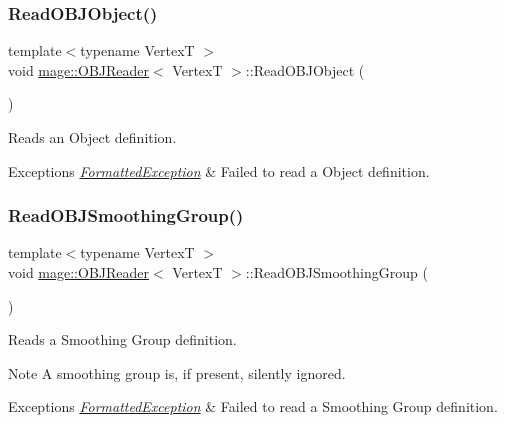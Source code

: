 \subsubsection{\texorpdfstring{Read\+O\+B\+J\+Object()}{ReadOBJObject()}}
{\footnotesize\ttfamily template$<$typename VertexT $>$ \\
void \hyperlink{classmage_1_1_o_b_j_reader}{mage\+::\+O\+B\+J\+Reader}$<$ VertexT $>$\+::Read\+O\+B\+J\+Object (\begin{DoxyParamCaption}{ }\end{DoxyParamCaption})\hspace{0.3cm}{\ttfamily [private]}}

Reads an Object definition.


\begin{DoxyExceptions}{Exceptions}
{\em \hyperlink{structmage_1_1_formatted_exception}{Formatted\+Exception}} & Failed to read a Object definition. \\
\hline
\end{DoxyExceptions}
\hypertarget{classmage_1_1_o_b_j_reader_a2dd830c506ffbfbcd932b9bf75a35c56}{}\label{classmage_1_1_o_b_j_reader_a2dd830c506ffbfbcd932b9bf75a35c56} 
\subsubsection{\texorpdfstring{Read\+O\+B\+J\+Smoothing\+Group()}{ReadOBJSmoothingGroup()}}
{\footnotesize\ttfamily template$<$typename VertexT $>$ \\
void \hyperlink{classmage_1_1_o_b_j_reader}{mage\+::\+O\+B\+J\+Reader}$<$ VertexT $>$\+::Read\+O\+B\+J\+Smoothing\+Group (\begin{DoxyParamCaption}{ }\end{DoxyParamCaption})\hspace{0.3cm}{\ttfamily [private]}}

Reads a Smoothing Group definition.

\begin{DoxyNote}{Note}
A smoothing group is, if present, silently ignored. 
\end{DoxyNote}

\begin{DoxyExceptions}{Exceptions}
{\em \hyperlink{structmage_1_1_formatted_exception}{Formatted\+Exception}} & Failed to read a Smoothing Group definition. \\
\hline
\end{DoxyExceptions}
\hypertarget{classmage_1_1_o_b_j_reader_a70fc61d8cc14dc8efbd73a88188cc511}{}\label{classmage_1_1_o_b_j_reader_a70fc61d8cc14dc8efbd73a88188cc511} 

